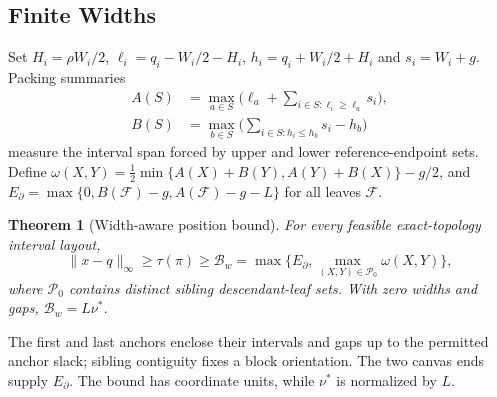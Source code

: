 \documentclass[review]{vgtc}
\newtheorem{theorem}{Theorem}
\begin{document}
\subsection{Finite Widths}
Set $H_i=\rho W_i/2$, $\ell_i=q_i-W_i/2-H_i$, $h_i=q_i+W_i/2+H_i$ and $s_i=W_i+g$. Packing summaries
\begin{equation}\label{eq:packing}
\begin{split}
A(S)&=\max_{a\in S}\bigl(\ell_a+\sum_{i\in S:\ell_i\ge\ell_a}s_i\bigr),\\
B(S)&=\max_{b\in S}\bigl(\sum_{i\in S:h_i\le h_b}s_i-h_b\bigr)
\end{split}
\end{equation}
measure the interval span forced by upper and lower reference-endpoint sets. Define $\omega(X,Y)=\tfrac12\min\{A(X)+B(Y),A(Y)+B(X)\}-g/2$, and $E_\partial=\max\{0,B(\mathcal F)-g,A(\mathcal F)-g-L\}$ for all leaves $\mathcal F$.
\begin{theorem}[Width-aware position bound]\label{thm:width}
For every feasible exact-topology interval layout,
\begin{equation}\label{eq:widthbound}
\|x-q\|_\infty\ge\tau(\pi)\ge\mathcal B_w
=\max\{E_\partial,\max_{(X,Y)\in\mathcal P_0}\omega(X,Y)\},
\end{equation}
where $\mathcal P_0$ contains distinct sibling descendant-leaf sets. With zero widths and gaps, $\mathcal B_w=L\nu^*$.
\end{theorem}
The first and last anchors enclose their intervals and gaps up to the permitted anchor slack; sibling contiguity fixes a block orientation. The two canvas ends supply $E_\partial$. The bound has coordinate units, while $\nu^*$ is normalized by $L$.
\end{document}
